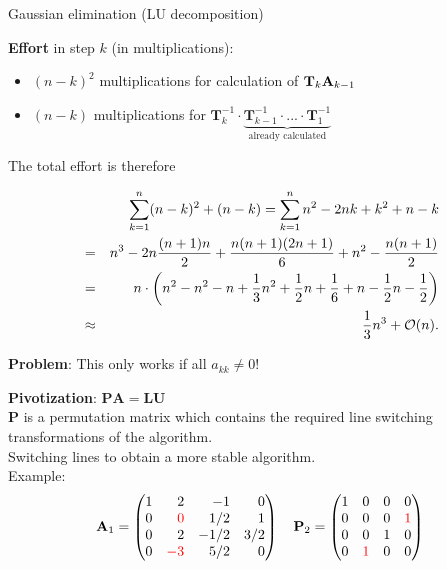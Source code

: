 \begin{vbframe}{Gaussian elimination (LU decomposition)}
\begin{enumerate}
\normalsize

\framebreak

\textbf{Effort} in step $k$ (in multiplications):

\begin{itemize}
\item $(n - k)^2$ multiplications for calculation of $\mathbf{T}_k\mathbf{A}_{k - 1}$
\item $(n-k)$ multiplications for $\mathbf{T}_k^{-1}\cdot \underbrace{\mathbf{T}_{k-1}^{-1} \cdot ... \cdot \mathbf{T}_{1}^{-1}}_{\text{already calculated}}$
\end{itemize}

The total effort is therefore

\vspace*{-0.3cm}

\begin{eqnarray*}
& &\sum_{k=1}^n (n - k)^2 + (n - k) = \sum_{k=1}^n n^2 - 2 n k + k^2 + n - k \\
&=& n^3 - 2n \frac{(n + 1)n}{2} + \frac{n(n + 1)(2n + 1)}{6} + n^2 - \frac{n(n+1)}{2} \\
&=& n \cdot \biggl(n^2 - n^2 - n + \frac{1}{3}n^2 + \frac{1}{2} n + \frac{1}{6} + n - \frac{1}{2} n - \frac{1}{2}\biggr) \\
&\approx& \frac{1}{3}n^3 + \mathcal{O}(n).
\end{eqnarray*}

\framebreak

\textbf{Problem}: This only works if all $a_{kk} \not= 0$!

\medskip
\textbf{Pivotization}: $\mathbf{PA} = \mathbf{LU}$\\
\medskip
$\mathbf{P}$ is a permutation matrix which contains the required line switching transformations of the algorithm. \\
\medskip
Switching lines to obtain a more stable algorithm.\\
\medskip
Example: \scriptsize
$$
\Amat_1 = \begin{pmatrix*}[r]
1 &  2 & -1   & 0 \\
0 &  \color{red}{0} & 1/2  & 1 \\
0 &  2 & -1/2 & 3/2 \\
0 & \color{red}{-3} & 5/2  & 0 \end{pmatrix*}
\quad
\mathbf{P}_2 =
\mat{
1 & 0 & 0 & 0 \\
0 & 0 & 0 & \color{red}{1} \\
0 & 0 & 1 & 0 \\
0 & \color{red}{1} & 0 & 0 }
$$


\end{enumerate}
\end{vbframe}
